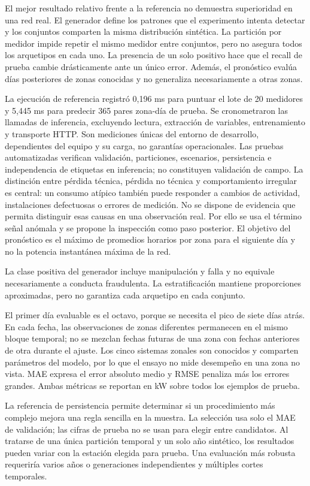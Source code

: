 \documentclass[conference]{IEEEtran}
\begin{document}
El mejor resultado relativo frente a la referencia no demuestra superioridad en una red real. El generador define los patrones que el experimento intenta detectar y los conjuntos comparten la misma distribución sintética. La partición por medidor impide repetir el mismo medidor entre conjuntos, pero no asegura todos los arquetipos en cada uno. La presencia de un solo positivo hace que el recall de prueba cambie drásticamente ante un único error. Además, el pronóstico evalúa días posteriores de zonas conocidas y no generaliza necesariamente a otras zonas.

La ejecución de referencia registró 0,196 ms para puntuar el lote de 20 medidores y 5,445 ms para predecir 365 pares zona-día de prueba. Se cronometraron las llamadas de inferencia, excluyendo lectura, extracción de variables, entrenamiento y transporte HTTP. Son mediciones únicas del entorno de desarrollo, dependientes del equipo y su carga, no garantías operacionales. Las pruebas automatizadas verifican validación, particiones, escenarios, persistencia e independencia de etiquetas en inferencia; no constituyen validación de campo.
La distinción entre pérdida técnica, pérdida no técnica y comportamiento irregular es central: un consumo atípico también puede responder a cambios de actividad, instalaciones defectuosas o errores de medición. No se dispone de evidencia que permita distinguir esas causas en una observación real. Por ello se usa el término señal anómala y se propone la inspección como paso posterior. El objetivo del pronóstico es el máximo de promedios horarios por zona para el siguiente día y no la potencia instantánea máxima de la red.

La clase positiva del generador incluye manipulación y falla y no equivale necesariamente a conducta fraudulenta. La estratificación mantiene proporciones aproximadas, pero no garantiza cada arquetipo en cada conjunto.

El primer día evaluable es el octavo, porque se necesita el pico de siete días atrás. En cada fecha, las observaciones de zonas diferentes permanecen en el mismo bloque temporal; no se mezclan fechas futuras de una zona con fechas anteriores de otra durante el ajuste. Los cinco sistemas zonales son conocidos y comparten parámetros del modelo, por lo que el ensayo no mide desempeño en una zona no vista. MAE expresa el error absoluto medio y RMSE penaliza más los errores grandes. Ambas métricas se reportan en kW sobre todos los ejemplos de prueba.

La referencia de persistencia permite determinar si un procedimiento más complejo mejora una regla sencilla en la muestra. La selección usa solo el MAE de validación; las cifras de prueba no se usan para elegir entre candidatos. Al tratarse de una única partición temporal y un solo año sintético, los resultados pueden variar con la estación elegida para prueba. Una evaluación más robusta requeriría varios años o generaciones independientes y múltiples cortes temporales.
\end{document}
